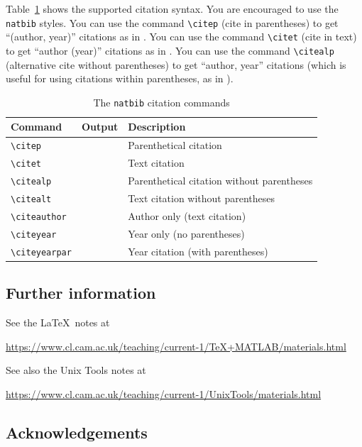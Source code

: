 \documentclass[12pt,a4paper]{article}
\begin{document}
Table~\ref{citation-guide} shows the supported citation syntax. You are
encouraged to use the \texttt{natbib} styles. You can use the command
\verb|\citep| (cite in parentheses) to get ``(author, year)'' citations as in
\citep{Chang14}. You can use the command \verb|\citet| (cite in text) to get
``author (year)'' citations as in \citet{Chang14}. You can use the command
\verb|\citealp| (alternative cite without parentheses) to get ``author, year''
citations (which is useful for using citations within parentheses, as in
\citealp{Chang14}).

\begin{table}[h]
    \centering
    \begin{tabular}{lll}
        \toprule
        \textbf{Command} & \textbf{Output} & \textbf{Description}\\
        \midrule
        \verb|\citep| & \citep{Chang14} & Parenthetical citation \\
        \verb|\citet| & \citet{Chang14} & Text citation \\
        \verb|\citealp| & \citealp{Chang14} & Parenthetical citation without parentheses \\
        \verb|\citealt| & \citealt{Chang14} & Text citation without parentheses \\
        \verb|\citeauthor| & \citeauthor{Chang14} & Author only (text citation) \\
        \verb|\citeyear| & \citeyear{Chang14} & Year only (no parentheses) \\
        \verb|\citeyearpar| & \citeyearpar{Chang14} & Year citation (with parentheses) \\
        \bottomrule
    \end{tabular}
    \caption{The \texttt{natbib} citation commands}
    \label{citation-guide}
\end{table}

\subsection{Further information}

See the \LaTeX~notes at

\url{https://www.cl.cam.ac.uk/teaching/current-1/TeX+MATLAB/materials.html}

\noindent
See also the Unix Tools notes at

\url{https://www.cl.cam.ac.uk/teaching/current-1/UnixTools/materials.html}

\subsection{Acknowledgements}
\end{document}
